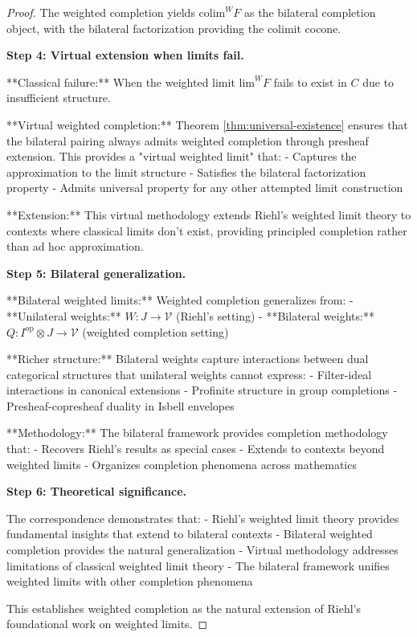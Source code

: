 \documentclass[11pt]{article}
\theoremstyle{plain}
\theoremstyle{definition}
\theoremstyle{remark}
\newcommand{\V}{\mathcal{V}}
\newcommand{\op}{\mathrm{op}}
\newcommand{\colim}{\mathrm{colim}}
\renewcommand{\lim}{\mathrm{lim}}
\begin{document}
\begin{proof}
The weighted completion yields $\colim^W F$ as the bilateral completion object, with the bilateral factorization providing the colimit cocone.

\textbf{Step 4: Virtual extension when limits fail.}

**Classical failure:** When the weighted limit $\lim^W F$ fails to exist in $C$ due to insufficient structure.

**Virtual weighted completion:** Theorem \ref{thm:universal-existence} ensures that the bilateral pairing always admits weighted completion through presheaf extension. This provides a "virtual weighted limit" that:
- Captures the approximation to the limit structure
- Satisfies the bilateral factorization property
- Admits universal property for any other attempted limit construction

**Extension:** This virtual methodology extends Riehl's weighted limit theory to contexts where classical limits don't exist, providing principled completion rather than ad hoc approximation.

\textbf{Step 5: Bilateral generalization.}

**Bilateral weighted limits:** Weighted completion generalizes from:
- **Unilateral weights:** $W : J \to \V$ (Riehl's setting)
- **Bilateral weights:** $Q : I^{\op} \otimes J \to \V$ (weighted completion setting)

**Richer structure:** Bilateral weights capture interactions between dual categorical structures that unilateral weights cannot express:
- Filter-ideal interactions in canonical extensions
- Profinite structure in group completions  
- Presheaf-copresheaf duality in Isbell envelopes

**Methodology:** The bilateral framework provides completion methodology that:
- Recovers Riehl's results as special cases
- Extends to contexts beyond weighted limits
- Organizes completion phenomena across mathematics

\textbf{Step 6: Theoretical significance.}

The correspondence demonstrates that:
- Riehl's weighted limit theory provides fundamental insights that extend to bilateral contexts
- Bilateral weighted completion provides the natural generalization
- Virtual methodology addresses limitations of classical weighted limit theory
- The bilateral framework unifies weighted limits with other completion phenomena

This establishes weighted completion as the natural extension of Riehl's foundational work on weighted limits.
\end{proof}
\end{document}
